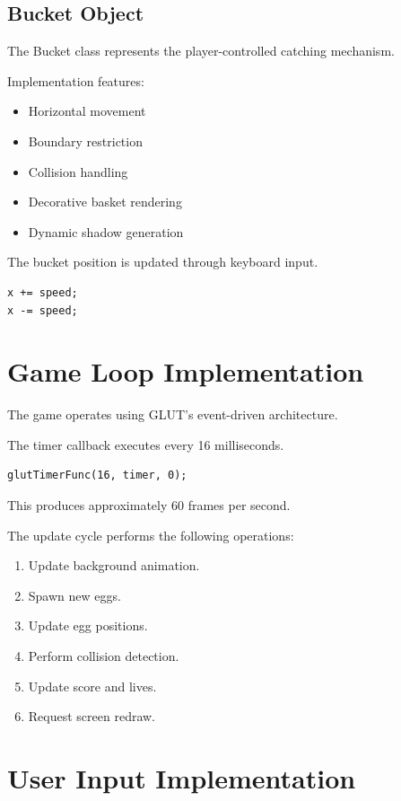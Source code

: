 \documentclass[12pt,a4paper]{report}
\begin{document}
\subsection*{Bucket Object}

The Bucket class represents the player-controlled catching mechanism.

Implementation features:

\begin{itemize}
\item Horizontal movement
\item Boundary restriction
\item Collision handling
\item Decorative basket rendering
\item Dynamic shadow generation
\end{itemize}

The bucket position is updated through keyboard input.

\begin{verbatim}
x += speed;
x -= speed;
\end{verbatim}

\section{Game Loop Implementation}

The game operates using GLUT's event-driven architecture.

The timer callback executes every 16 milliseconds.

\begin{verbatim}
glutTimerFunc(16, timer, 0);
\end{verbatim}

This produces approximately 60 frames per second.

The update cycle performs the following operations:

\begin{enumerate}
\item Update background animation.
\item Spawn new eggs.
\item Update egg positions.
\item Perform collision detection.
\item Update score and lives.
\item Request screen redraw.
\end{enumerate}

\section{User Input Implementation}
\end{document}
